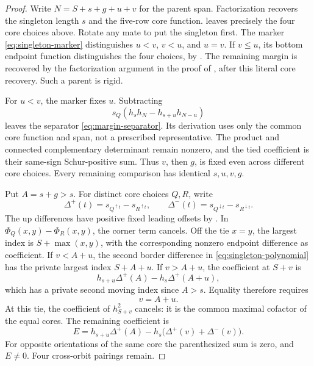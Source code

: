 \documentclass[11pt,a4paper]{amsart}
\numberwithin{equation}{section}
\theoremstyle{plain}
\theoremstyle{definition}
\begin{document}
\begin{proof}
Write \(N=S+s+g+u+v\) for the parent span.  Factorization recovers the
singleton length \(s\) and the five-row core function.
 leaves precisely the four core
choices above.  Rotate any mate to put the singleton first.
The marker \eqref{eq:singleton-marker} distinguishes \(u<v\),
\(v<u\), and \(u=v\).  If \(v\le u\), its bottom endpoint
function distinguishes the four choices, by
.
The remaining margin is recovered by the factorization argument in the
proof of , after this literal core recovery.
Such a parent is rigid.

For \(u<v\), the marker fixes \(u\).  Subtracting
\[
 s_Q(h_sh_N-h_{s+u}h_{N-u})
\]
leaves the separator \eqref{eq:margin-separator}.  Its derivation uses
only the common core function and span, not a prescribed representative.
The product and connected complementary determinant remain nonzero, and
the tied coefficient is their same-sign Schur-positive sum.
Thus \(v\), then \(g\), is fixed even across different core choices.
Every remaining comparison has identical \(s,u,v,g\).

Put \(A=s+g>s\).  For distinct core choices \(Q,R\), write
\[
 \Delta^+(t)=s_{Q^{\uparrow t}}-s_{R^{\uparrow t}},\qquad
 \Delta^-(t)=s_{Q^{\downarrow t}}-s_{R^{\downarrow t}}.
\]
The up differences have positive fixed leading offsets by
.
In \(\Phi_Q(x,y)-\Phi_R(x,y)\), the corner term cancels.  Off the
tie \(x=y\), the largest index is \(S+\max(x,y)\), with the
corresponding nonzero endpoint difference as coefficient.
If \(v<A+u\), the second border difference in
\eqref{eq:singleton-polynomial} has the private largest index
\(S+A+u\).  If \(v>A+u\), the coefficient at \(S+v\) is
\[
 h_{s+u}\Delta^+(A)-h_s\Delta^+(A+u),
\]
which has a private second moving index since \(A>s\).
Equality therefore requires
\begin{equation}\label{eq:exceptional-interface-tie}
 v=A+u.
\end{equation}
At this tie, the coefficient of \(h_{S+v}^2\) cancels: it is the
common maximal cofactor of the equal cores.  The remaining coefficient is
\begin{equation}\label{eq:exceptional-interface-coefficient}
 E=h_{s+u}\Delta^+(A)-h_s\bigl(\Delta^+(v)+\Delta^-(v)\bigr).
\end{equation}
For opposite orientations of the same core the parenthesized sum is zero,
and \(E\ne0\).  Four cross-orbit pairings remain.


\end{proof}
\end{document}
